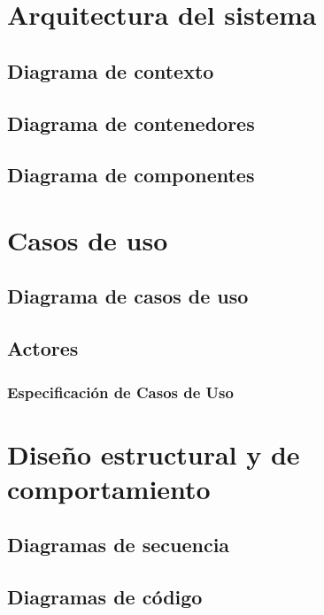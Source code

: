 \section{Arquitectura del sistema}
\subsection{Diagrama de contexto}
\subsection{Diagrama de contenedores}
\subsection{Diagrama de componentes}

\section{Casos de uso}
\subsection{Diagrama de casos de uso}
\subsection{Actores}
\subsubsection{Especificación de Casos de Uso}

\section{Diseño estructural y de comportamiento}
\subsection{Diagramas de secuencia}
\subsection{Diagramas de código}
